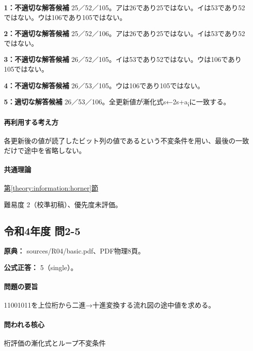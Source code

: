 \noindent\textbf{1：不適切な解答候補} 25／52／105。アは26であり25ではない。イは53であり52ではない。ウは106であり105ではない。\par

\noindent\textbf{2：不適切な解答候補} 25／52／106。アは26であり25ではない。イは53であり52ではない。\par

\noindent\textbf{3：不適切な解答候補} 26／52／105。イは53であり52ではない。ウは106であり105ではない。\par

\noindent\textbf{4：不適切な解答候補} 26／53／105。ウは106であり105ではない。\par

\noindent\textbf{5：適切な解答候補} 26／53／106。全更新値が漸化式s←2s+a\textsubscript{i}に一致する。\par

\paragraph{再利用する考え方} 各更新後の値が読了したビット列の値であるという不変条件を用い、最後の一致だけで途中を省略しない。

\paragraph{共通理論} \hyperref[theory:information:horner]{第\ref*{theory:information:horner}節}

\par 難易度 2（校準初稿）、優先度未評価。

\subsection{令和4年度 問2-5}
\label{q:r04-reg-basic-2-5}

\noindent\textbf{原典：} sources/R04/basic.pdf、PDF物理8頁。

\textbf{公式正答：} 5（single）。

\paragraph{問題の要旨} 11001011を上位桁から二進→十進変換する流れ図の途中値を求める。

\paragraph{問われる核心} 桁評価の漸化式とループ不変条件

